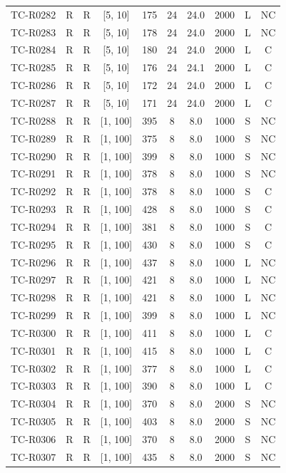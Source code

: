 \begin{longtable}{lccccccccc}
TC-R0282 & R & R & [5, 10] & 175 & 24 & 24.0 & 2000 & L & NC \\
TC-R0283 & R & R & [5, 10] & 178 & 24 & 24.0 & 2000 & L & NC \\
TC-R0284 & R & R & [5, 10] & 180 & 24 & 24.0 & 2000 & L & C \\
TC-R0285 & R & R & [5, 10] & 176 & 24 & 24.1 & 2000 & L & C \\
TC-R0286 & R & R & [5, 10] & 172 & 24 & 24.0 & 2000 & L & C \\
TC-R0287 & R & R & [5, 10] & 171 & 24 & 24.0 & 2000 & L & C \\
TC-R0288 & R & R & [1, 100] & 395 & 8 & 8.0 & 1000 & S & NC \\
TC-R0289 & R & R & [1, 100] & 375 & 8 & 8.0 & 1000 & S & NC \\
TC-R0290 & R & R & [1, 100] & 399 & 8 & 8.0 & 1000 & S & NC \\
TC-R0291 & R & R & [1, 100] & 378 & 8 & 8.0 & 1000 & S & NC \\
TC-R0292 & R & R & [1, 100] & 378 & 8 & 8.0 & 1000 & S & C \\
TC-R0293 & R & R & [1, 100] & 428 & 8 & 8.0 & 1000 & S & C \\
TC-R0294 & R & R & [1, 100] & 381 & 8 & 8.0 & 1000 & S & C \\
TC-R0295 & R & R & [1, 100] & 430 & 8 & 8.0 & 1000 & S & C \\
TC-R0296 & R & R & [1, 100] & 437 & 8 & 8.0 & 1000 & L & NC \\
TC-R0297 & R & R & [1, 100] & 421 & 8 & 8.0 & 1000 & L & NC \\
TC-R0298 & R & R & [1, 100] & 421 & 8 & 8.0 & 1000 & L & NC \\
TC-R0299 & R & R & [1, 100] & 399 & 8 & 8.0 & 1000 & L & NC \\
TC-R0300 & R & R & [1, 100] & 411 & 8 & 8.0 & 1000 & L & C \\
TC-R0301 & R & R & [1, 100] & 415 & 8 & 8.0 & 1000 & L & C \\
TC-R0302 & R & R & [1, 100] & 377 & 8 & 8.0 & 1000 & L & C \\
TC-R0303 & R & R & [1, 100] & 390 & 8 & 8.0 & 1000 & L & C \\
TC-R0304 & R & R & [1, 100] & 370 & 8 & 8.0 & 2000 & S & NC \\
TC-R0305 & R & R & [1, 100] & 403 & 8 & 8.0 & 2000 & S & NC \\
TC-R0306 & R & R & [1, 100] & 370 & 8 & 8.0 & 2000 & S & NC \\
TC-R0307 & R & R & [1, 100] & 435 & 8 & 8.0 & 2000 & S & NC \\

\end{longtable}
